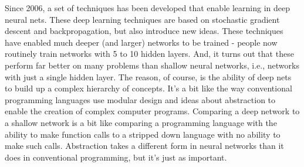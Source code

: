Since 2006, a set of techniques has been developed that enable learning in deep neural nets. These deep learning techniques are based on stochastic gradient descent and backpropagation, but also introduce new ideas. These techniques have enabled much deeper (and larger) networks to be trained - people now routinely train networks with 5 to 10 hidden layers. And, it turns out that these perform far better on many problems than shallow neural networks, i.e., networks with just a single hidden layer. The reason, of course, is the ability of deep nets to build up a complex hierarchy of concepts. It's a bit like the way conventional programming languages use modular design and ideas about abstraction to enable the creation of complex computer programs. Comparing a deep network to a shallow network is a bit like comparing a programming language with the ability to make function calls to a stripped down language with no ability to make such calls. Abstraction takes a different form in neural networks than it does in conventional programming, but it's just as important.

\newpage